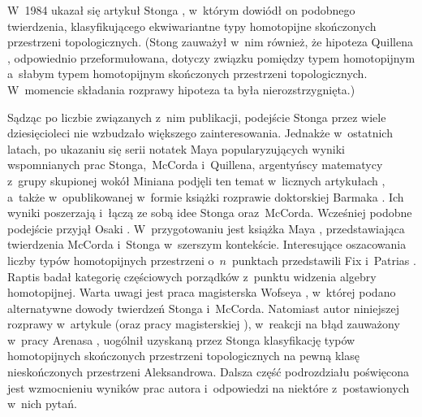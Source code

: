 W~1984 ukazał się artykuł Stonga \cite{Stong84}, w~którym dowiódł on podobnego twierdzenia, klasyfikującego ekwiwariantne typy homotopijne skończonych przestrzeni topologicznych. (Stong zauważył w~nim również, że hipoteza Quillena \cite{Quillen78}, odpowiednio przeformułowana, dotyczy związku pomiędzy typem homotopijnym a~słabym typem homotopijnym skończonych przestrzeni topologicznych. W~momencie składania rozprawy hipoteza ta była nierozstrzygnięta.)

Sądząc po liczbie związanych z~nim publikacji, podejście Stonga przez wiele dziesięcioleci nie wzbudzało większego zainteresowania. Jednakże w~ostatnich latach, po ukazaniu się serii notatek Maya \cite{May08,May08a,May08b} popularyzujących wyniki wspomnianych prac Stonga,~McCorda i~Quillena, argentyńscy matematycy z~grupy skupionej wokół Miniana podjęli ten temat w~licznych artykułach \cite{Barmak07,Barmak11a,Barmak08a,Barmak08,Cerdeiro14}, a~także w~opublikowanej w~formie książki rozprawie doktorskiej Barmaka \cite{Barmak11}. Ich wyniki poszerzają i~łączą ze sobą idee Stonga oraz~McCorda. Wcześniej podobne podejście przyjął Osaki \cite{Osaki99}. W~przygotowaniu jest książka Maya \cite{May}, przedstawiająca twierdzenia McCorda i~Stonga w~szerszym kontekście. Interesujące oszacowania liczby typów homotopijnych przestrzeni o~$n$~punktach przedstawili Fix i~Patrias \cite{Fix08}. Raptis \cite{Raptis10} badał kategorię częściowych porządków z~punktu widzenia algebry homotopijnej. Warta uwagi jest praca magisterska Wofseya \cite{Wofsey08}, w~której podano alternatywne dowody twierdzeń Stonga i~McCorda. Natomiast autor niniejszej rozprawy w~artykule \cite{Kukiela10} (oraz pracy magisterskiej \cite{Kukiela10a}), w~reakcji na błąd zauważony w~pracy Arenasa \cite{Arenas99}, uogólnił uzyskaną przez Stonga klasyfikację typów homotopijnych skończonych przestrzeni topologicznych na pewną klasę nieskończonych przestrzeni Aleksandrowa. Dalsza część podrozdziału poświęcona jest wzmocnieniu wyników prac autora \cite{Kukiela10a,Kukiela10} i~odpowiedzi na niektóre z~postawionych w~nich pytań.



